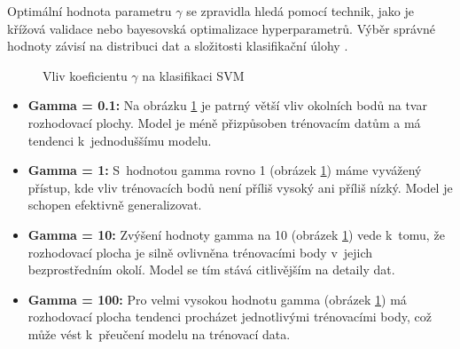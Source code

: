 Optimální hodnota parametru \(\gamma\) se zpravidla hledá pomocí technik, jako je křížová validace nebo bayesovská optimalizace hyperparametrů. Výběr správné hodnoty závisí na distribuci dat a složitosti klasifikační úlohy \cite{kernel_types, bergstra2011algorithms}.


\begin{figure}[h!]
  \begin{center}
  \caption{Vliv koeficientu \(\gamma\) na klasifikaci SVM}
  \end{center}\label{chart:gamma}
\end{figure}

\begin{itemize}
\item \textbf{Gamma = 0.1:} Na obrázku \ref{chart:gamma} je patrný větší vliv okolních bodů na tvar rozhodovací plochy. Model je méně přizpůsoben trénovacím datům a má tendenci k~jednoduššímu modelu.
\item \textbf{Gamma = 1:} S~hodnotou gamma rovno 1 (obrázek \ref{chart:gamma}) máme vyvážený přístup, kde vliv trénovacích bodů není příliš vysoký ani příliš nízký. Model je schopen efektivně generalizovat.

\item \textbf{Gamma = 10:} Zvýšení hodnoty gamma na 10 (obrázek \ref{chart:gamma}) vede k~tomu, že rozhodovací plocha je silně ovlivněna trénovacími body v~jejich bezprostředním okolí. Model se tím stává citlivějším na detaily dat.

\item \textbf{Gamma = 100:} Pro velmi vysokou hodnotu gamma (obrázek \ref{chart:gamma}) má rozhodovací plocha tendenci procházet jednotlivými trénovacími body, což může vést k~přeučení modelu na trénovací data.
\end{itemize}

